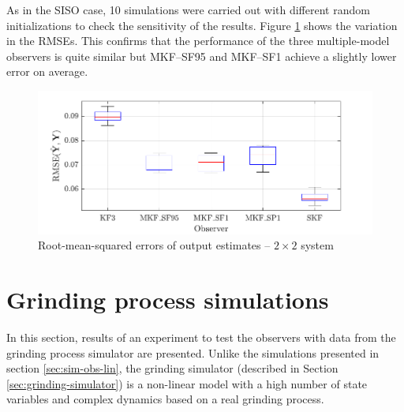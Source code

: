 As in the SISO case, 10 simulations were carried out with different random initializations to check the sensitivity of the results. Figure \ref{fig:rod-obs-sim2-yest-all-seed-RMSE-box} shows the variation in the RMSEs. This confirms that the performance of the three multiple-model observers is quite similar but MKF--SF95 and MKF--SF1 achieve a slightly lower error on average.
\begin{figure}[htp]
	\centering
	\includegraphics[width=12cm]{images/rod_obs_sim3_all_seed_y_err_box.pdf}
	\caption{Root-mean-squared errors of output estimates – $2\times2$ system}
	\label{fig:rod-obs-sim2-yest-all-seed-RMSE-box}
\end{figure}

\section{Grinding process simulations} \label{sec:sim-ore-SISO}

In this section, results of an experiment to test the observers with data from the grinding process simulator are presented. Unlike the simulations presented in section \ref{sec:sim-obs-lin}, the grinding simulator (described in Section \ref{sec:grinding-simulator}) is a non-linear model with a high number of state variables and complex dynamics based on a real grinding process.

